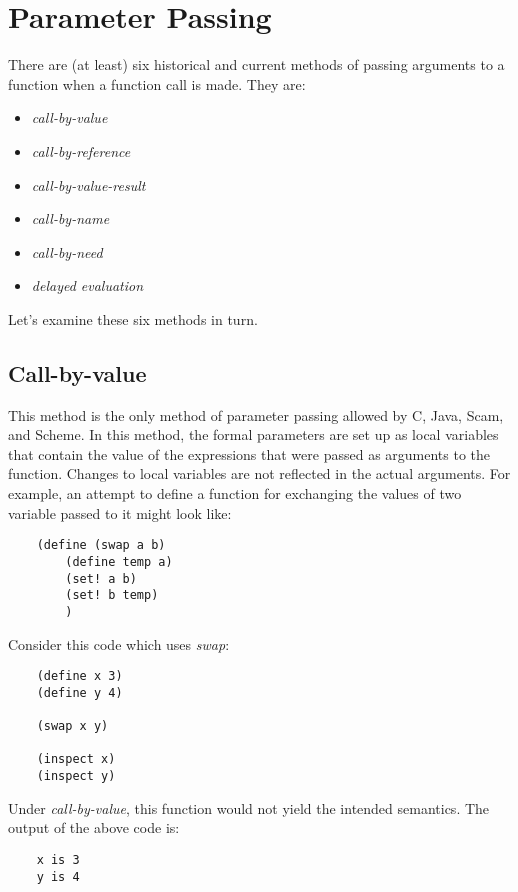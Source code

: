 \chapter{Parameter Passing}
\label{ParameterPassing}

There are (at least) six historical and current
methods of passing arguments to a function when a function call
is made. They are:

\begin{itemize}
\item
    {\it call-by-value}
\item
    {\it call-by-reference}
\item
    {\it call-by-value-result}
\item
    {\it call-by-name}
\item
    {\it call-by-need}
\item
    {\it delayed evaluation}
\end{itemize}

Let's examine these six methods in turn.

\section*{Call-by-value}

This method is the only method of parameter passing allowed by C, Java,
Scam, and Scheme. In this method, the formal parameters are set up as local
variables that contain the value of the expressions that were passed as
arguments to the function. Changes to local variables are not reflected
in the actual arguments. For example, an attempt to define a function
for exchanging the values
of two variable passed to it might look like:

\begin{verbatim}
    (define (swap a b)
        (define temp a)
        (set! a b)
        (set! b temp)
        )
\end{verbatim}

Consider this code which uses {\it swap}:

\begin{verbatim}
    (define x 3)
    (define y 4)

    (swap x y)

    (inspect x)
    (inspect y)
\end{verbatim}

Under {\it call-by-value},
this function would not yield the intended semantics.
The output of the above code is:

\begin{verbatim}
    x is 3
    y is 4
\end{verbatim}

